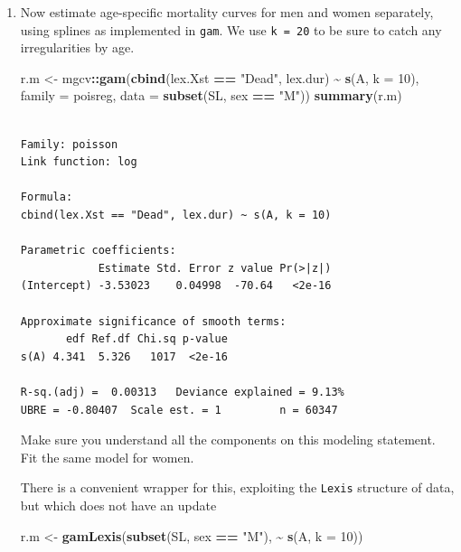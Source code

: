 \documentclass[
]{book}
\newenvironment{Shaded}{\begin{snugshade}}{\end{snugshade}}
\newcommand{\AttributeTok}[1]{\textcolor[rgb]{0.13,0.29,0.53}{#1}}
\newcommand{\DecValTok}[1]{\textcolor[rgb]{0.00,0.00,0.81}{#1}}
\newcommand{\FunctionTok}[1]{\textcolor[rgb]{0.13,0.29,0.53}{\textbf{#1}}}
\newcommand{\NormalTok}[1]{#1}
\newcommand{\OtherTok}[1]{\textcolor[rgb]{0.56,0.35,0.01}{#1}}
\newcommand{\SpecialCharTok}[1]{\textcolor[rgb]{0.81,0.36,0.00}{\textbf{#1}}}
\newcommand{\StringTok}[1]{\textcolor[rgb]{0.31,0.60,0.02}{#1}}
\theoremstyle{definition}
\theoremstyle{definition}
\theoremstyle{definition}
\theoremstyle{definition}
\theoremstyle{remark}
\begin{document}
\begin{enumerate}
\def\labelenumi{\arabic{enumi}.}
\item
  Now estimate age-specific mortality curves for men and
  women separately, using splines as implemented in \texttt{gam}.
  We use \texttt{k\ =\ 20} to be sure to catch any irregularities by age.

\begin{Shaded}
\begin{Highlighting}[]
\NormalTok{r.m }\OtherTok{\textless{}{-}}\NormalTok{ mgcv}\SpecialCharTok{::}\FunctionTok{gam}\NormalTok{(}\FunctionTok{cbind}\NormalTok{(lex.Xst }\SpecialCharTok{==} \StringTok{"Dead"}\NormalTok{, lex.dur) }\SpecialCharTok{\textasciitilde{}} \FunctionTok{s}\NormalTok{(A, }\AttributeTok{k =} \DecValTok{10}\NormalTok{),}
                 \AttributeTok{family =}\NormalTok{ poisreg,}
                   \AttributeTok{data =} \FunctionTok{subset}\NormalTok{(SL, sex }\SpecialCharTok{==} \StringTok{"M"}\NormalTok{))}
\FunctionTok{summary}\NormalTok{(r.m)}
\end{Highlighting}
\end{Shaded}

\begin{verbatim}

Family: poisson 
Link function: log 

Formula:
cbind(lex.Xst == "Dead", lex.dur) ~ s(A, k = 10)

Parametric coefficients:
            Estimate Std. Error z value Pr(>|z|)
(Intercept) -3.53023    0.04998  -70.64   <2e-16

Approximate significance of smooth terms:
       edf Ref.df Chi.sq p-value
s(A) 4.341  5.326   1017  <2e-16

R-sq.(adj) =  0.00313   Deviance explained = 9.13%
UBRE = -0.80407  Scale est. = 1         n = 60347
\end{verbatim}

  Make sure you understand all the components on this modeling statement.
  Fit the same model for women.

  There is a convenient wrapper for this, exploiting the \texttt{Lexis}
  structure of data, but which does not have an update

\begin{Shaded}
\begin{Highlighting}[]
\NormalTok{r.m }\OtherTok{\textless{}{-}} \FunctionTok{gamLexis}\NormalTok{(}\FunctionTok{subset}\NormalTok{(SL, sex }\SpecialCharTok{==} \StringTok{"M"}\NormalTok{), }\SpecialCharTok{\textasciitilde{}} \FunctionTok{s}\NormalTok{(A, }\AttributeTok{k =} \DecValTok{10}\NormalTok{))}
\end{Highlighting}
\end{Shaded}


\end{enumerate}
\end{document}

